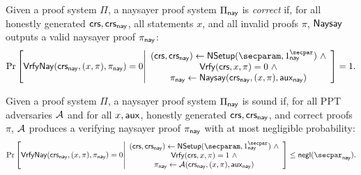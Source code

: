 \begin{definition}
    Given a proof system $\Pi$, a naysayer proof system $\Pi_{\mathsf{nay}}$ is \emph{correct} if, for all honestly generated $\mathsf{crs}, \mathsf{crs}_{\mathsf{nay}}$, all statements $x$, and all invalid proofs $\pi$, $\mathsf{Naysay}$ outputs a valid naysayer proof $\pi_{\mathsf{nay}}$:
\begin{equation}
    \Pr\left[
        \vrfynay(\crs_{\nay}, (x,\pi), \pi_{\nay})=0 
        \middle| 
        \begin{array}{c}
            (\crs, \crs_{\nay}) \gets {\sf N}\setup(\secparam, 1^\naysecparam)~\land\\
            \vrfy(\crs, x,\pi)=0~\land\\
            \pi_{\nay} \gets \naysay(\crs_{\nay}, (x, \pi), \aux_{\nay})
        \end{array}
    \right] = 1.
\end{equation}
\end{definition}

\begin{definition} Given a proof system $\Pi$, a naysayer proof system $\Pi_{\mathsf{nay}}$ is sound if, for all PPT adversaries $\mathcal{A}$ and for all $x, \mathsf{aux}$, honestly generated $\mathsf{crs}, \mathsf{crs}_{\mathsf{nay}}$, and correct proofs $\pi$, $\mathcal{A}$ produces a verifying naysayer proof $\pi_{\mathsf{nay}}$ with at most negligible probability:
\begin{equation}
    \Pr\left[
        \vrfynay(\crs_{\nay}, (x,\pi), \pi_{\nay})=0 
        \middle| 
        \begin{array}{c}
            (\crs, \crs_{\nay}) \gets {\sf N}\setup(\secparam, 1^\naysecparam)~\land\\
            \vrfy(\crs, x,\pi)=1~\land\\
            \pi_{\nay} \gets \adv(\crs_{\nay}, (x, \pi), \aux_{\nay})
        \end{array}
    \right] \leq\mathsf{negl}(\naysecparam).
\end{equation}
\end{definition}

